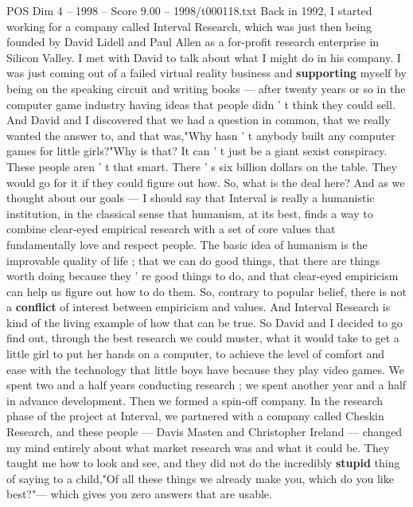 \begin{textsample}{POS Dim 4 – 1998 – Score 9.00 – 1998/t000118.txt}  \label{ex:f4_pos_014}
Back in 1992, I started working for a company called Interval Research, which was just then being founded by David Lidell and Paul Allen as a for-profit research enterprise in Silicon Valley.
I met with David to talk about what I might do in his company.
I was just coming out of a failed virtual reality business and \textbf{supporting} myself by being on the speaking circuit and writing books — after twenty years or so in the computer game industry having ideas that people didn ' t think they could sell.
And David and I discovered that we had a question in common, that we really wanted the answer to, and that was,"Why hasn ' t anybody built any computer games for little girls?"Why is that?
It can ' t just be a giant sexist conspiracy.
These people aren ' t that smart.
There ' s six billion dollars on the table.
They would go for it if they could figure out how.
So, what is the deal here?
And as we thought about our goals — I should say that Interval is really a humanistic institution, in the classical sense that humanism, at its best, finds a way to combine clear-eyed empirical research with a set of core values that fundamentally love and respect people.
The basic idea of humanism is the improvable quality of life ; that we can do good things, that there are things worth doing because they ' re good things to do, and that clear-eyed empiricism can help us figure out how to do them.
So, contrary to popular belief, there is not a \textbf{conflict} of interest between empiricism and values.
And Interval Research is kind of the living example of how that can be true.
So David and I decided to go find out, through the best research we could muster, what it would take to get a little girl to put her hands on a computer, to achieve the level of comfort and ease with the technology that little boys have because they play video games.
We spent two and a half years conducting research ; we spent another year and a half in advance development.
Then we formed a spin-off company.
In the research phase of the project at Interval, we partnered with a company called Cheskin Research, and these people — Davis Masten and Christopher Ireland — changed my mind entirely about what market research was and what it could be.
They taught me how to look and see, and they did not do the incredibly \textbf{stupid} thing of saying to a child,"Of all these things we already make you, which do you like best?"— which gives you zero answers that are usable.

\end{textsample}
